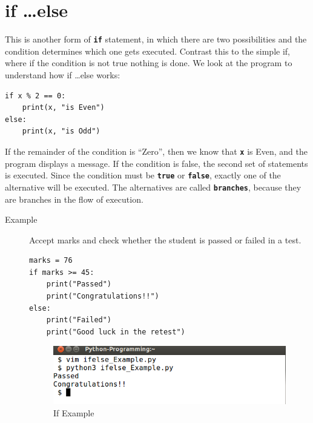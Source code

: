\documentclass[11pt,a4paper]{article}
\newcommand{\Code}[1]{\textbf{\texttt{#1}}}
\begin{document}
\section*{if \ldots else}
This is another form of \Code{if} statement, in which there are two possibilities and the condition determines which one gets executed. Contrast this to the simple if, where if the condition is not true nothing is done.
We look at the program to understand how if \ldots else works:
\begin{verbatim}
if x % 2 == 0:
    print(x, "is Even")
else:
    print(x, "is Odd")
\end{verbatim}
If the remainder of the condition is ``Zero'', then we know that \Code{x} is Even, and the program displays a message. If the condition is false, the second set of statements is executed. Since the condition must be \Code{true} or \Code{false}, exactly one of the alternative will be executed. The alternatives are called \Code{branches}, because they are branches in the flow of execution.

\begin{description}
\item[Example ] Accept marks and check whether the student is passed or failed in a test. 
\begin{lstlisting}
marks = 76
if marks >= 45:
    print("Passed")
    print("Congratulations!!")
else:
    print("Failed")
    print("Good luck in the retest")
\end{lstlisting}

\begin{figure}[ht]
\begin{center}
\includegraphics[scale=0.4]{Output_ifelse_Example.png}
\caption{If Example}
\label{If_Example}\end{center}
\end{figure}
\end{description}
\end{document}
